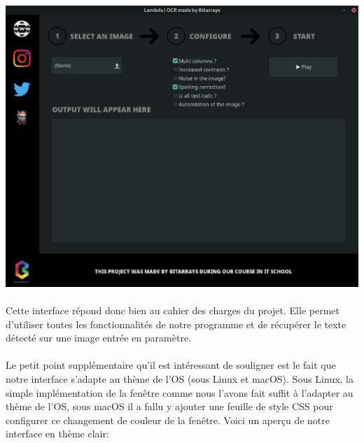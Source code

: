 \documentclass{article}
\begin{document}
\begin{center}
	\includegraphics[scale=0.25]{glade-terminal-interface}
\end{center}


\paragraph{}Cette interface répond donc bien au cahier des charges du projet. Elle permet d'utiliser toutes les fonctionnalités de notre programme et de récupérer le texte détecté sur une image entrée en paramètre.

\paragraph{}Le petit point supplémentaire qu'il est intéressant de souligner est le fait que notre interface s'adapte au thème de l'OS (sous Linux et macOS). Sous Linux, la simple implémentation de la fenêtre comme nous l'avons fait suffit à l'adapter au thème de l'OS, sous macOS il a fallu y ajouter une feuille de style CSS pour configurer ce changement de couleur de la fenêtre. Voici un aperçu de notre interface en thème clair: 
\end{document}
